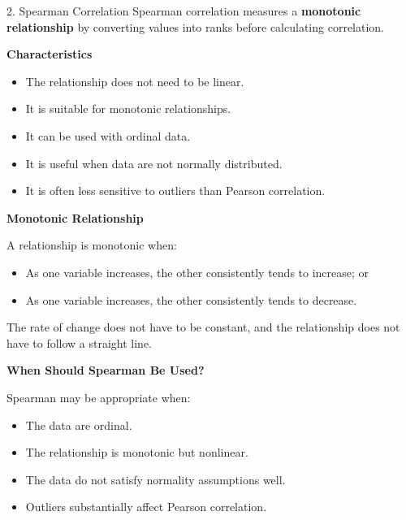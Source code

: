 \documentclass[aspectratio=169,11pt]{beamer}
\begin{document}
\begin{frame}[allowframebreaks]{2. Spearman Correlation}
\footnotesize
Spearman correlation measures a \textbf{monotonic relationship} by converting values into ranks before calculating correlation.\par\medskip
\textbf{Characteristics}\par\medskip
\begin{itemize}
\item The relationship does not need to be linear.
\item It is suitable for monotonic relationships.
\item It can be used with ordinal data.
\item It is useful when data are not normally distributed.
\item It is often less sensitive to outliers than Pearson correlation.
\end{itemize}
\textbf{Monotonic Relationship}\par\medskip
A relationship is monotonic when:\par\medskip
\begin{itemize}
\item As one variable increases, the other consistently tends to increase; or
\item As one variable increases, the other consistently tends to decrease.
\end{itemize}
The rate of change does not have to be constant, and the relationship does not have to follow a straight line.\par\medskip
\textbf{When Should Spearman Be Used?}\par\medskip
Spearman may be appropriate when:\par\medskip
\begin{itemize}
\item The data are ordinal.
\item The relationship is monotonic but nonlinear.
\item The data do not satisfy normality assumptions well.
\item Outliers substantially affect Pearson correlation.
\end{itemize}
\end{frame}
\end{document}
